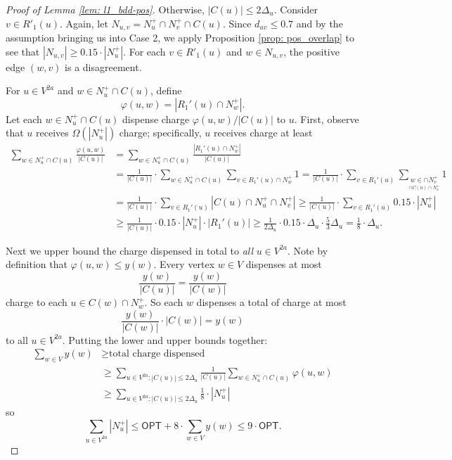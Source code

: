\documentclass[11pt]{article}
\begin{document}
\begin{proof}[Proof of Lemma \ref{lem: l1_bdd-pos}]
Otherwise, $|C(u)| \leq 2\Delta_u$.  Consider $v \in R'_1(u)$. Again, let $N_{u,v} = N_u^+ \cap N_v^+ \cap C(u)$. Since $d_{uv} \leq 0.7$ and by the assumption bringing us into Case 2, we apply Proposition \ref{prop: pos_overlap} to see that $|N_{u,v}| \geq 0.15 \cdot |N_u^+|$. 
For each $v \in R'_1(u)$ and $w \in N_{u,v}$, the positive edge $(w,v)$ is a disagreement. 


   For $u \in  V^{2a}$ and $w \in N_u^+ \cap C(u)$, define 
    $$\varphi(u,w) = |R_1'(u)\cap N_w^+  |.$$
    Let each $w \in N_u^+ \cap C(u)$ dispense charge $\varphi(u,w)/|C(u)|$ to $u$.
First, observe that $u$ receives $\Omega(|N_u^+|)$ charge; specifically, $u$ receives charge  at least 
 \begin{align*}
    \sum_{w \in N_u^+ \cap C(u)} \frac{\varphi(u,w)}{|C(u)|}
    &= \sum_{w \in N_u^+ \cap C(u)} \frac{|R_1'(u)  \cap N_w^+|}{|C(u)|}  \\
       & = \frac{1}{|C(u)|}\cdot\sum_{w \in N_u^+ \cap C(u)} \sum_{v \in R_1'(u)  \cap N_w^+} 1  
    = \frac{1}{|C(u)|}\cdot\sum_{v \in R_1'(u)} \sum_{\underset{ \cap C(u) \cap N_u^+}     {w \in  \cap N_v^+}} 1 \\
        &= \frac{1}{|C(u)|}\cdot\sum_{v \in R_1'(u)} | C(u) \cap N_u^+ \cap N_v^+| \geq 
        \frac{1}{|C(u)|}\cdot\sum_{v \in R_1'(u)} 0.15\cdot | N_u^+ | \\
    &\geq \frac{1}{|C(u)|}\cdot 0.15 \cdot |N_u^+| \cdot |R_1'(u)| \geq \frac{1}{2\Delta_u}\cdot 0.15 \cdot \Delta_u \cdot \frac{5}{3}\Delta_u = \frac{1}{8} \cdot \Delta_u.
 \end{align*}


Next we upper bound the charge dispensed in total to \emph{all} $u \in V^{2a}$. Note by definition that $\varphi(u,w) \leq y(w)$. Every vertex $w \in V$ dispenses at most
    $$\frac{y(w)}{|C(u)|} = \frac{y(w)}{|C(w)|}$$
    charge to each $u \in C(w) \cap N_w^+$. 
    So each $w$ dispenses a total of charge at most 
    \[\frac{y(w)}{|C(w)|} \cdot |C(w)| = y(w)\]
     to all $u \in V^{2a}$. 
    Putting the lower and upper bounds together:  
    \begin{align*}
        \sum_{w \in V} y(w) &\geq \text{total charge dispensed} \\
        &\geq \sum_{u \in  V^{2a}: |C(u)| \leq 2\Delta_u} \frac{1}{|C(u)|} \sum_{w \in N_u^+ \cap C(u)} \varphi(u,w) \\
        &\geq \sum_{u \in  V^{2a}: |C(u)| \leq 2\Delta_u} \frac{1}{8} \cdot |N_u^+|
    \end{align*}
    so 
    \[\boxed{\sum_{u \in  V^{2a}} |N_u^+| \leq \textsf{OPT} + 8  \cdot \sum_{w \in V} y(w) \leq 9 \cdot \textsf{OPT}.}\]


\end{proof}
\end{document}
